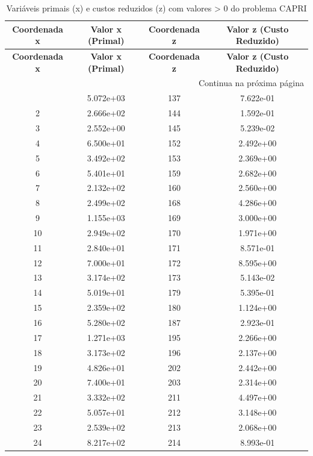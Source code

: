 \documentclass[12pt]{article}
\begin{document}
\begin{longtable}{@{}cccc@{}}
\caption{Variáveis primais (x) e custos reduzidos (z) com valores > 0 do problema CAPRI} \\
\toprule
\textbf{Coordenada x} & \textbf{Valor x (Primal)} & \textbf{Coordenada z} & \textbf{Valor z (Custo Reduzido)} \\
\midrule
\endfirsthead

\toprule
\textbf{Coordenada x} & \textbf{Valor x (Primal)} & \textbf{Coordenada z} & \textbf{Valor z (Custo Reduzido)} \\
\midrule
\endhead

\midrule \multicolumn{4}{r}{{Continua na próxima página}} \\ \midrule
\endfoot

\bottomrule
\endlastfoot
1 & 5.072e+03 & 137 & 7.622e-01 \\
2 & 2.666e+02 & 144 & 1.592e-01 \\
3 & 2.552e+00 & 145 & 5.239e-02 \\
4 & 6.500e+01 & 152 & 2.492e+00 \\
5 & 3.492e+02 & 153 & 2.369e+00 \\
6 & 5.401e+01 & 159 & 2.682e+00 \\
7 & 2.132e+02 & 160 & 2.560e+00 \\
8 & 2.499e+02 & 168 & 4.286e+00 \\
9 & 1.155e+03 & 169 & 3.000e+00 \\
10 & 2.949e+02 & 170 & 1.971e+00 \\
11 & 2.840e+01 & 171 & 8.571e-01 \\
12 & 7.000e+01 & 172 & 8.595e+00 \\
13 & 3.174e+02 & 173 & 5.143e-02 \\
14 & 5.019e+01 & 179 & 5.395e-01 \\
15 & 2.359e+02 & 180 & 1.124e+00 \\
16 & 5.280e+02 & 187 & 2.923e-01 \\
17 & 1.271e+03 & 195 & 2.266e+00 \\
18 & 3.173e+02 & 196 & 2.137e+00 \\
19 & 4.826e+01 & 202 & 2.442e+00 \\
20 & 7.400e+01 & 203 & 2.314e+00 \\
21 & 3.332e+02 & 211 & 4.497e+00 \\
22 & 5.057e+01 & 212 & 3.148e+00 \\
23 & 2.539e+02 & 213 & 2.068e+00 \\
24 & 8.217e+02 & 214 & 8.993e-01 \\

\end{longtable}
\end{document}
